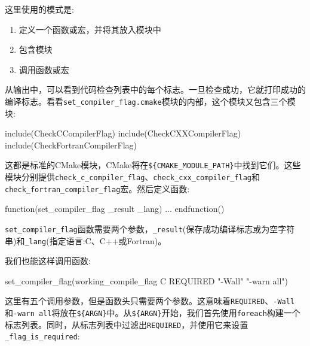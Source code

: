 
这里使用的模式是:

\begin{enumerate}
\item 定义一个函数或宏，并将其放入模块中

\item 包含模块

\item 调用函数或宏

\end{enumerate}

从输出中，可以看到代码检查列表中的每个标志。一旦检查成功，它就打印成功的编译标志。看看\texttt{set\_compiler\_flag.cmake}模块的内部，这个模块又包含三个模块:

\begin{codebox}[cmake]
include(CheckCCompilerFlag)
include(CheckCXXCompilerFlag)
include(CheckFortranCompilerFlag)
\end{codebox}

这都是标准的CMake模块，CMake将在\texttt{\$\{CMAKE\_MODULE\_PATH\}}中找到它们。这些模块分别提供\texttt{check\_c\_compiler\_flag}、\texttt{check\_cxx\_compiler\_flag}和\texttt{check\_fortran\_compiler\_flag}宏。然后定义函数:

\begin{codebox}[cmake]
function(set_compiler_flag _result _lang)
    ...
endfunction()
\end{codebox}

\texttt{set\_compiler\_flag}函数需要两个参数，\texttt{\_result}(保存成功编译标志或为空字符串)和\texttt{\_lang}(指定语言:C、C++或Fortran)。

我们也能这样调用函数:

\begin{codebox}[cmake]
set_compiler_flag(working_compile_flag C REQUIRED "-Wall" "-warn all")
\end{codebox}

这里有五个调用参数，但是函数头只需要两个参数。这意味着\texttt{REQUIRED}、\texttt{-Wall}和\texttt{-warn all}将放在\texttt{\$\{ARGN\}}中。从\texttt{\$\{ARGN\}}开始，我们首先使用\texttt{foreach}构建一个标志列表。同时，从标志列表中过滤出\texttt{REQUIRED}，并使用它来设置\texttt{\_flag\_is\_required}:


